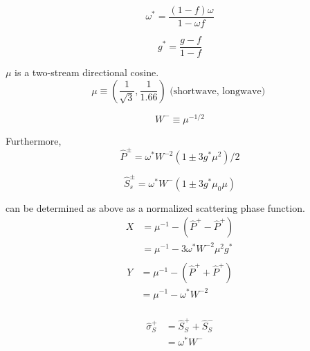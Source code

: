 \begin{equation}
\omega^{*}=\frac{(1-f) \omega}{1-\omega f}
\end{equation}

\begin{equation}
g^{*}=\frac{g-f}{1-f}
\end{equation}

\(\mu\) is a two-stream directional cosine. \begin{equation}
\mu \equiv\left(\frac{1}{\sqrt{3}}, \frac{1}{1.66}\right) \text { (shortwave, longwave) }
\end{equation}

\begin{equation}
W^{-} \equiv \mu^{-1 / 2}
\end{equation}

Furthermore, \begin{equation}
\hat{P}^{\pm}=\omega^{*} W^{-2}\left(1 \pm 3 g^{*} \mu^{2}\right) / 2
\end{equation}

\begin{equation}
\hat{S}_{s}^{\pm}=\omega^{*} W^{-}\left(1 \pm 3 g^{*} \mu_{0} \mu\right)
\end{equation}

can be determined as above as a normalized scattering phase function. \begin{equation}
\begin{aligned}
X &=\mu^{-1}-\left(\hat{P}^{+}-\hat{P}^{+}\right) \\
&=\mu^{-1}-3 \omega^{*} W^{-2} \mu^{2} g^{*} \\
\end{aligned}
\end{equation} \begin{equation}
\begin{aligned}
Y &=\mu^{-1}-\left(\hat{P}^{+}+\hat{P}^{+}\right) \\
&=\mu^{-1}-\omega^{*} W^{-2} \\
\end{aligned}
\end{equation}

\begin{equation}
\begin{aligned}
\hat{\sigma}_{S}^{+} &=\hat{S}_{S}^{+}+\hat{S}_{S}^{-} \\
&=\omega^{*} W^{-} \\
\end{aligned}
\end{equation}


